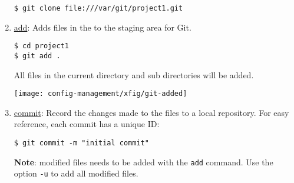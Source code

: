 \begin{enumerate}

\begin{lstlisting}
$ git clone file:///var/git/project1.git
\end{lstlisting}
%
\newslide
\item \underline{add}: Adds files in the to the staging area for Git.
  \begin{lstlisting}
$ cd project1
$ git add .
  \end{lstlisting}
All files in the current directory and sub directories will be added.
%
\newslide
\begin{center}
\texttt{[image: config-management/xfig/git-added]}
\end{center}
\newslide
\item \underline{commit}: Record the changes made to the files to a local repository. For easy reference, each commit has a unique ID:
  \begin{lstlisting}
$ git commit -m "initial commit"
  \end{lstlisting}
{\bfseries Note}:
  modified files needs to be added with the \verb|add| command.
  Use the option \verb|-u| to add all modified files.
  \begin{lstlisting}

\end{lstlisting}
\end{enumerate}
